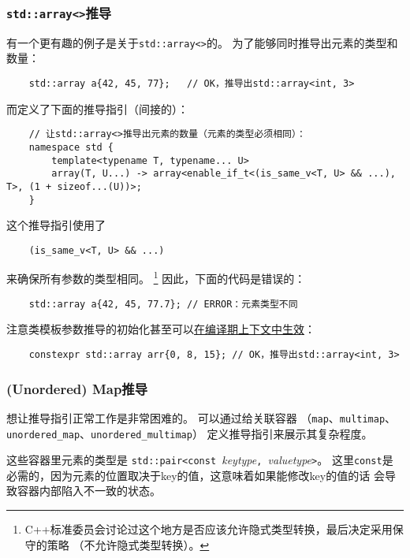 \subsubsection{\texttt{std::array<>}推导}\label{ch9.2.6.3}
有一个更有趣的例子是关于\texttt{std::array<>}的。
为了能够同时推导出元素的类型和数量：
\begin{lstlisting}
    std::array a{42, 45, 77};   // OK，推导出std::array<int, 3>
\end{lstlisting}
而定义了下面的推导指引（间接的）：
\begin{lstlisting}
    // 让std::array<>推导出元素的数量（元素的类型必须相同）：
    namespace std {
        template<typename T, typename... U>
        array(T, U...) -> array<enable_if_t<(is_same_v<T, U> && ...), T>, (1 + sizeof...(U))>;
    }
\end{lstlisting}
这个推导指引使用了
\begin{lstlisting}
    (is_same_v<T, U> && ...)
\end{lstlisting}
来确保所有参数的类型相同。
\footnote{C++标准委员会讨论过这个地方是否应该允许隐式类型转换，最后决定采用保守的策略
（不允许隐式类型转换）。}
因此，下面的代码是错误的：
\begin{lstlisting}
    std::array a{42, 45, 77.7}; // ERROR：元素类型不同
\end{lstlisting}
注意类模板参数推导的初始化甚至可以\hyperref[ch28.5]{在编译期上下文中生效}：
\begin{lstlisting}
    constexpr std::array arr{0, 8, 15}; // OK，推导出std::array<int, 3>
\end{lstlisting}

\subsubsection{(Unordered) Map推导}
想让推导指引正常工作是非常困难的。
可以通过给关联容器
（\texttt{map}、\texttt{multimap}、\texttt{unordered\_map}、\texttt{unordered\_multimap}）
定义推导指引来展示其复杂程度。

这些容器里元素的类型是
\texttt{std::pair<const }\emph{keytype}\texttt{, }\emph{valuetype}\texttt{>}。
这里\texttt{const}是必需的，因为元素的位置取决于key的值，这意味着如果能修改key的值的话
会导致容器内部陷入不一致的状态。

